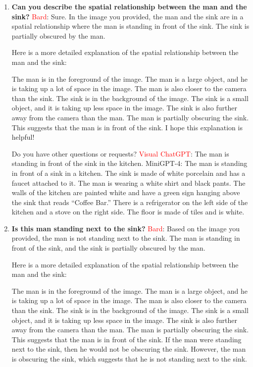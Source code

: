 \begin{enumerate}
    \item \textbf{Can you describe the spatial relationship between the man and the sink?}
    \subitem \textcolor{Red}{Bard}: 
    Sure. In the image you provided, the man and the sink are in a spatial relationship where the man is standing in front of the sink. The sink is partially obscured by the man.
    
    Here is a more detailed explanation of the spatial relationship between the man and the sink:
    
    The man is in the foreground of the image. The man is a large object, and he is taking up a lot of space in the image. The man is also closer to the camera than the sink.
    The sink is in the background of the image. The sink is a small object, and it is taking up less space in the image. The sink is also further away from the camera than the man.
    The man is partially obscuring the sink. This suggests that the man is in front of the sink.
    I hope this explanation is helpful!
    
    Do you have other questions or requests?
    \subitem \textcolor{red}{Visual ChatGPT}: The man is standing in front of the sink in the kitchen.
    \subitem MiniGPT-4: The man is standing in front of a sink in a kitchen. The sink is made of white porcelain and has a faucet attached to it. The man is wearing a white shirt and black pants. The walls of the kitchen are painted white and have a green sign hanging above the sink that reads “Coffee Bar.” There is a refrigerator on the left side of the kitchen and a stove on the right side. The floor is made of tiles and is white.
    \item \textbf{Is this man standing next to the sink?}
    \subitem \textcolor{Red}{Bard}: 
    Based on the image you provided, the man is not standing next to the sink. The man is standing in front of the sink, and the sink is partially obscured by the man.
    
    Here is a more detailed explanation of the spatial relationship between the man and the sink:
    
    The man is in the foreground of the image. The man is a large object, and he is taking up a lot of space in the image. The man is also closer to the camera than the sink.
    The sink is in the background of the image. The sink is a small object, and it is taking up less space in the image. The sink is also further away from the camera than the man.
    The man is partially obscuring the sink. This suggests that the man is in front of the sink.
    If the man were standing next to the sink, then he would not be obscuring the sink. However, the man is obscuring the sink, which suggests that he is not standing next to the sink.
    

\end{enumerate}

